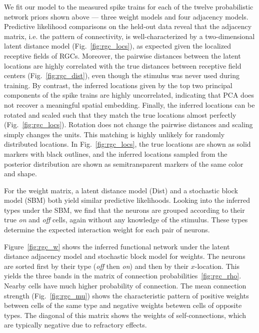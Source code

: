 \sloppy
We fit our model to the measured spike trains for each of the twelve
probabilistic network priors shown above --- three weight models and
four adjacency models. Predictive likelihood comparisons on the
held-out data reveal that the adjacency matrix, i.e. the pattern of
connectivity, is well-characterized by a two-dimensional latent
distance model (Fig.~\ref{fig:rgc_locs}), as expected given the
localized receptive fields of RGCs. Moreover, the pairwise distances
between the latent locations are highly correlated with the true
distances between receptive field centers (Fig.~\ref{fig:rgc_dist}),
even though the stimulus was never used during training. By contrast,
the inferred locations given by the top two principal components of
the spike trains are highly uncorrelated, indicating that PCA does not
recover a meaningful spatial embedding.  Finally, the inferred
locations can be rotated and scaled such that they match the true
locations almost perfectly (Fig.~\ref{fig:rgc_locs}). Rotation does
not change the pairwise distances and scaling simply changes the
units. This matching is highly unlikely for randomly distributed
locations.  In Fig.~\ref{fig:rgc_locs}, the true locations are shown
as solid markers with black outlines, and the inferred locations
sampled from the posterior distribution are shown as semitransparent
markers of the same color and shape.

For the weight matrix, a latent distance model (Dist) and a stochastic
block model (SBM) both yield similar predictive likelihoods. Looking
into the inferred types under the SBM, we find that the neurons are
grouped according to their true \textit{on} and \textit{off} cells,
again without any knowledge of the stimulus. These types determine 
the expected interaction weight for each pair of neurons. 

Figure~\ref{fig:rgc_w} shows the inferred functional network under the
latent distance adjacency model and stochastic block model for
weights.  The neurons are sorted first by their type (\textit{off}
then \textit{on}) and then by their $x$-location. This yields the
three bands in the matrix of connection
probabilities~\ref{fig:rgc_rho}. Nearby cells have much higher
probability of connection. The mean connection strength
(Fig.~\ref{fig:rgc_mu}) shows the characteristic pattern of positive
weights between cells of the same type and negative weights betewen
cells of opposite types. The diagonal of this matrix shows the weights
of self-connections, which are typically negative due to refractory
effects. 

